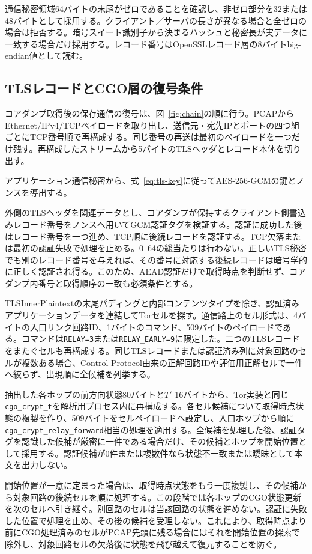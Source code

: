 \documentclass[10pt,a4paper]{ltjsarticle}
\newcommand{\code}[1]{\nolinkurl{#1}}
\begin{document}
通信秘密領域64バイトの末尾がゼロであることを確認し、非ゼロ部分を32または48バイトとして採用する。クライアント／サーバの長さが異なる場合と全ゼロの場合は拒否する。暗号スイート識別子から決まるハッシュと秘密長が実データに一致する場合だけ採用する。レコード番号はOpenSSLレコード層の8バイトbig-endian値として読む。

\subsection{TLSレコードとCGO層の復号条件}

コアダンプ取得後の保存通信の復号は、図~\ref{fig:chain}の順に行う。PCAPからEthernet/IPv4/TCPペイロードを取り出し、送信元・宛先IPとポートの四つ組ごとにTCP番号順で再構成する。同じ番号の再送は最初のペイロードを一つだけ残す。再構成したストリームから5バイトのTLSヘッダとレコード本体を切り出す。

アプリケーション通信秘密から、式~\eqref{eq:tls-key}に従ってAES-256-GCMの鍵とノンスを導出する。

外側のTLSヘッダを関連データとし、コアダンプが保持するクライアント側書込みレコード番号をノンスへ用いてGCM認証タグを検証する。認証に成功した後はレコード番号を一つ進め、TCP順に後続レコードを認証する。TCP欠落または最初の認証失敗で処理を止める。0--64の総当たりは行わない。正しいTLS秘密でも別のレコード番号を与えれば、その番号に対応する後続レコードは暗号学的に正しく認証され得る。このため、AEAD認証だけで取得時点を判断せず、コアダンプ内番号と取得順序の一致も必須条件とする。

TLSInnerPlaintextの末尾パディングと内部コンテンツタイプを除き、認証済みアプリケーションデータを連結してTorセルを探す。通信路上のセル形式は、4バイトの入口リンク回路ID、1バイトのコマンド、509バイトのペイロードである。コマンドは\code{RELAY=3}または\code{RELAY_EARLY=9}に限定した。二つのTLSレコードをまたぐセルも再構成する。同じTLSレコードまたは認証済み列に対象回路のセルが複数ある場合、Control Protocol由来の正解回路IDや評価用正解セルで一件へ絞らず、出現順に全候補を列挙する。


抽出した各ホップの前方向状態80バイトと$T'$ 16バイトから、Tor実装と同じ\code{cgo_crypt_t}を解析用プロセス内に再構成する。各セル候補について取得時点状態の複製を作り、509バイトをセルペイロードへ設定し、入口ホップから順に\code{cgo_crypt_relay_forward}相当の処理を適用する。全候補を処理した後、認証タグを認識した候補が厳密に一件である場合だけ、その候補とホップを開始位置として採用する。認証候補が0件または複数件なら状態不一致または曖昧として本文を出力しない。

開始位置が一意に定まった場合は、取得時点状態をもう一度複製し、その候補から対象回路の後続セルを順に処理する。この段階では各ホップのCGO状態更新を次のセルへ引き継ぐ。別回路のセルは当該回路の状態を進めない。認証に失敗した位置で処理を止め、その後の候補を受理しない。これにより、取得時点より前にCGO処理済みのセルがPCAP先頭に残る場合にはそれを開始位置の探索で除外し、対象回路セルの欠落後に状態を飛び越えて復元することを防ぐ。
\end{document}
